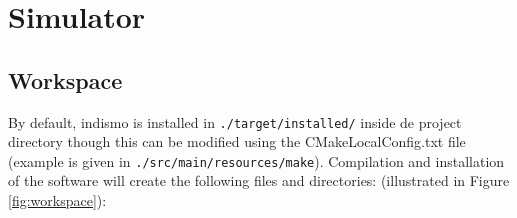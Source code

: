 \chapter{Simulator}
\label{chap:simulator}


\section{Workspace}

By default, indismo is installed in \texttt{./target/installed/} inside de project directory though this can be modified using the CMakeLocalConfig.txt file (example is given in \texttt{./src/main/resources/make}). Compilation and installation of the software will create the following files and directories: (illustrated in Figure \ref{fig:workspace}):

